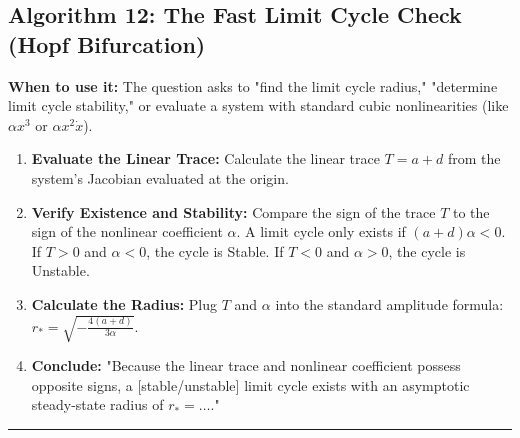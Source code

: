 \documentclass[11pt, a4paper]{report}
\begin{document}
\subsection*{Algorithm 12: The Fast Limit Cycle Check (Hopf Bifurcation)}
\textbf{When to use it:} The question asks to "find the limit cycle radius," "determine limit cycle stability," or evaluate a system with standard cubic nonlinearities (like $\alpha x^3$ or $\alpha x^2 \dot{x}$).
\begin{enumerate}[label=\textbf{\arabic*.}]
    \item \textbf{Evaluate the Linear Trace:} Calculate the linear trace $T = a+d$ from the system's Jacobian evaluated at the origin.
    \item \textbf{Verify Existence and Stability:} Compare the sign of the trace $T$ to the sign of the nonlinear coefficient $\alpha$. A limit cycle only exists if $(a+d)\alpha < 0$. If $T > 0$ and $\alpha < 0$, the cycle is Stable. If $T < 0$ and $\alpha > 0$, the cycle is Unstable.
    \item \textbf{Calculate the Radius:} Plug $T$ and $\alpha$ into the standard amplitude formula: $r_* = \sqrt{-\frac{4(a+d)}{3\alpha}}$.
    \item \textbf{Conclude:} "Because the linear trace and nonlinear coefficient possess opposite signs, a [stable/unstable] limit cycle exists with an asymptotic steady-state radius of $r_* = \dots$."
\end{enumerate}
\vspace{1em}
\noindent\rule{\textwidth}{0.4pt}
\vspace{1em}
\end{document}
